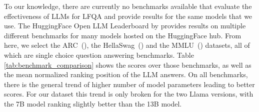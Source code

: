 To our knowledge, there are currently no benchmarks available that evaluate the effectiveness of LLMs for LFQA and provide results for the same models that we use.
The HuggingFace Open LLM Leaderboard by \cite{beeching:2023:Open} provides results on multiple different benchmarks for many models hosted on the HuggingFace hub.
From here, we select the ARC~(\cite{clark:2018:Think}), the HellaSwag~(\cite{zellers:2019:HellaSwag}) and the MMLU~(\cite{hendrycks:2020:Measuring}) datasets, all of which are single choice question answering benchmarks.
Table \ref{tab:benchmark_comparison} shows the scores over those benchmarks, as well as the mean normalized ranking position of the LLM answers.
On all benchmarks, there is the general trend of higher number of model parameters leading to better scores.
For our dataset this trend is only broken for the two Llama versions, with the 7B model ranking slightly better than the 13B model.
